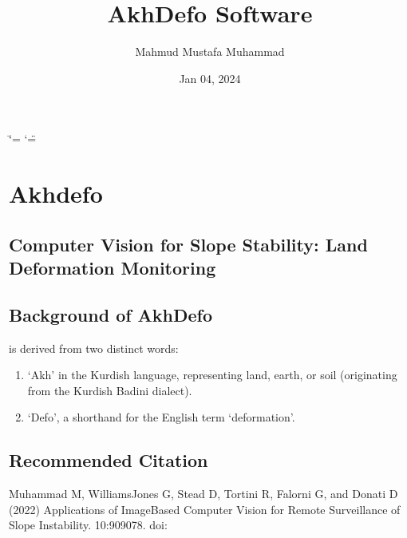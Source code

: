 \documentclass[letterpaper,10pt,english]{sphinxmanual}
\title{AkhDefo Software}
\date{Jan 04, 2024}
\author{Mahmud Mustafa Muhammad}
\let\sphinxpxdimen\pdfpxdimen\else\newdimen\sphinxpxdimen
\begin{document}
\ifdefined\shorthandoff
  \ifnum\catcode`\=\string=\active\shorthandoff{=}\fi
  \ifnum\catcode`\"=\active{}\fi
\fi

\pagestyle{empty}
\sphinxmaketitle
\pagestyle{plain}
\sphinxtableofcontents
\pagestyle{normal}
\label{\detokenize{index::doc}}


\noindent{\hspace*{\fill}\sphinxincludegraphics[width=200\sphinxpxdimen]{{akhdefo_logo}.svg}}

\sphinxstepscope


\chapter{Akhdefo}
\label{\detokenize{README:akhdefo}}\label{\detokenize{README::doc}}



\section{Computer Vision for Slope Stability: Land Deformation Monitoring}
\label{\detokenize{README:computer-vision-for-slope-stability-land-deformation-monitoring}}

\section{Background of Akh\sphinxhyphen{}Defo}
\label{\detokenize{README:background-of-akh-defo}}
\sphinxAtStartPar
{} is derived from two distinct words:
\begin{enumerate}
%
\item {} 
\sphinxAtStartPar
‘Akh’ in the Kurdish language, representing land, earth, or soil (originating from the Kurdish Badini dialect).

\item {} 
\sphinxAtStartPar
‘Defo’, a shorthand for the English term ‘deformation’.

\end{enumerate}


\section{Recommended Citation}
\label{\detokenize{README:recommended-citation}}
\sphinxAtStartPar
Muhammad M, Williams\sphinxhyphen{}Jones G, Stead D, Tortini R, Falorni G, and Donati D (2022) Applications of Image\sphinxhyphen{}Based Computer Vision for Remote Surveillance of Slope Instability.  10:909078. doi: 
\end{document}
